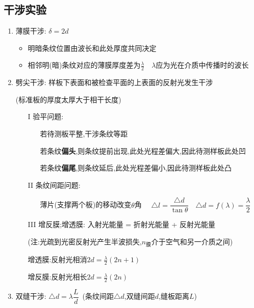 \documentclass{article}
\begin{document}
\subsection{干涉实验}
\begin{enumerate}[label = (\arabic*{})]
    \item 薄膜干涉: $\delta = 2d$
          \begin{itemize}
              \item 明暗条纹位置由波长和此处厚度共同决定
              \item 相邻明(暗)条纹对应的薄膜厚度差为$\frac{\lambda}{2} \quad \lambda$应为光在介质中传播时的波长
          \end{itemize}
    \item 劈尖干涉: 样板下表面和被检查平面的上表面的反射光发生干涉

          \hspace{5em}(标准板的厚度太厚大于相干长度)

          \begin{itemize}
              \item[I] 验平问题:
                  \begin{itemize}
                      \item[] 若待测板平整,干涉条纹等距
                      \item[] 若条纹\textbf{偏头},则条纹提前出现,此处光程差偏大,因此待测样板此处凹
                      \item[] 若条纹\textbf{偏尾},则条纹延后,此处光程差偏小,因此待测样板此处凸
                  \end{itemize}
              \item[II] 条纹间距问题:
                  \begin{itemize}
                      \item[] 薄片(支撑两个板)的移动改变$\theta$角 $\quad \triangle l = \dfrac{\triangle d}{\tan{\theta}} \quad
                              \triangle d = f(\lambda) = \dfrac{\lambda}{2}$
                  \end{itemize}
              \item[III] 增反膜;增透膜: 入射光能量 = 折射光能量 + 反射光能量

                  \hspace{4em}(注:光疏到光密反射光产生半波损失,$n_{\text{膜}}$介于空气和另一介质之间)

                  \hspace{4em}增透膜:反射光相消$2d = \frac{\lambda}{2} (2n+1)$

                  \hspace{4em}增反膜:反射光相长$2d = \frac{\lambda}{2} (2n) $
          \end{itemize}

    \item 双缝干涉: $\triangle d = \lambda \dfrac{L}{d} \,$ (条纹间距$\triangle d $,双缝间距$d$,缝板距离$L$)
\end{enumerate}
\end{document}
